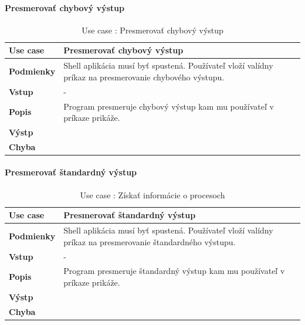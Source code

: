 \paragraph{Presmerovať chybový výstup}
\begin{center}
	\begin{table}[htbp]
		\begin{tabular}{|p{2.5cm}|p{14cm}|}
			\hline
			\textbf{Use case} & Presmerovať chybový výstup \\ 
			\hline
			\textbf{Podmienky} & Shell aplikácia musí byť spustená. Používateľ vloží valídny príkaz na presmerovanie chybového výstupu. \\ 
			\hline
			\textbf{Vstup} & -\\
			\hline
			\textbf{Popis} & Program presmeruje chybový výstup kam mu používateľ v príkaze prikáže. \\ 
			\hline
			\textbf{Výstp} & \\
			\hline
			\textbf{Chyba} & \\
			\hline
		\end{tabular}
		\label{table:1}
		\caption{Use case : Presmerovať chybový výstup}
	\end{table}
\end{center}
\paragraph{Presmerovať štandardný výstup}
\begin{center}
	\begin{table}[htbp]
		\begin{tabular}{|p{2.5cm}|p{14cm}|}
			\hline
			\textbf{Use case} & Presmerovať štandardný výstup \\ 
			\hline
			\textbf{Podmienky} & Shell aplikácia musí byť spustená. Používateľ vloží valídny príkaz na presmerovanie štandardného výstupu. \\ 
			\hline
			\textbf{Vstup} & -\\
			\hline
			\textbf{Popis} & Program presmeruje štandardný výstup kam mu používateľ v príkaze prikáže.\\ 
			\hline
			\textbf{Výstp} & \\
			\hline
			\textbf{Chyba} & \\
			\hline
		\end{tabular}
		\label{table:1}
		\caption{Use case : Získať informácie o procesoch}
	\end{table}
\end{center}
